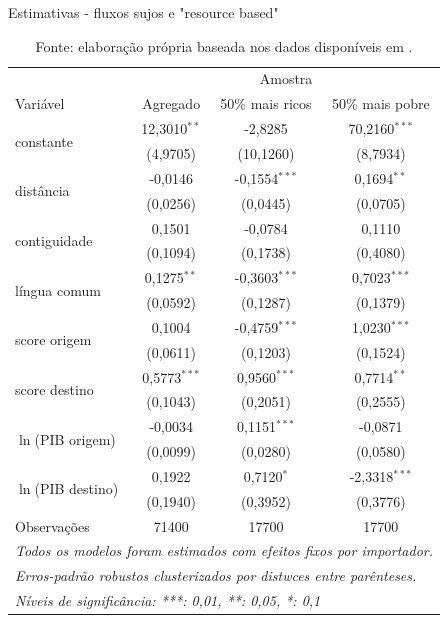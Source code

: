 \begin{table}[H]
\centering
\caption{Estimativas - fluxos sujos e "resource based"}
\label{tab:resultados_rb}
\begin{tabular}{@{}lccc@{}}
 & \multicolumn{3}{c}{Amostra} \\ \cmidrule(l){2-4} 
Variável & Agregado & 50\% mais ricos & 50\% mais pobre \\ \midrule
\multirow{2}{*}{constante} & 12,3010$^{**}$ & -2,8285 & 70,2160$^{***}$ \\
 & (4,9705) & (10,1260) & (8,7934) \\
\multirow{2}{*}{distância} & -0,0146 & -0,1554$^{***}$ & 0,1694$^{**}$ \\
 & (0,0256) & (0,0445) & (0,0705) \\
\multirow{2}{*}{contiguidade} & 0,1501 & -0,0784 & 0,1110 \\
 & (0,1094) & (0,1738) & (0,4080) \\
\multirow{2}{*}{língua comum} & 0,1275$^{**}$ & -0,3603$^{***}$ & 0,7023$^{***}$ \\
 & (0,0592) & (0,1287) & (0,1379) \\
\multirow{2}{*}{score origem} & 0,1004 & -0,4759$^{***}$ & 1,0230$^{***}$ \\
 & (0,0611) & (0,1203) & (0,1524) \\
\multirow{2}{*}{score destino} & 0,5773$^{***}$ & 0,9560$^{***}$ & 0,7714$^{**}$ \\
 & (0,1043) & (0,2051) & (0,2555) \\
\multirow{2}{*}{$\ln$(PIB origem)} & -0,0034 & 0,1151$^{***}$ & -0,0871 \\
 & (0,0099) & (0,0280) & (0,0580) \\
\multirow{2}{*}{$\ln$(PIB destino)} & 0,1922 & 0,7120$^{*}$ & -2,3318$^{***}$ \\
 & (0,1940) & (0,3952) & (0,3776) \\ \midrule
Observações& 71400&17700&17700\\
\bottomrule\bottomrule
\multicolumn{4}{l}{\emph{Todos os modelos foram estimados com efeitos fixos por importador.}}\\
\multicolumn{4}{l}{\emph{Erros-padrão robustos clusterizados por distwces entre parênteses.}}\\
\multicolumn{4}{l}{\emph{Níveis de significância: ***: 0,01, **: 0,05, *: 0,1}}\\
\end{tabular}
\caption*{\RaggedRight  Fonte: elaboração própria baseada nos dados disponíveis em \cite{Cepii2019, Comtrade2019, WorldBank2019}.} 
\end{table}

